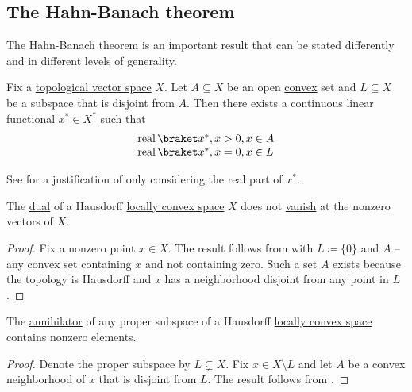 \subsection{The Hahn-Banach theorem}\label{subsec:hahn_banach}

The Hahn-Banach theorem is an important result that can be stated differently and in different levels of generality.

\begin{theorem}\label{thm:geometric_hahn_banach}\mcite\cite[24]{Йоффе1974}
  Fix a \hyperref[def:topological_vector_space]{topological vector space} \( X \). Let \( A \subseteq X \) be an open \hyperref[def:convex_set]{convex} set and \( L \subseteq X \) be a subspace that is disjoint from \( A \). Then there exists a continuous linear functional \( x^* \in X^* \) such that
  \begin{equation*}
    \begin{array}{l}
      \real \inner{x^*} x > 0, x \in A \\
      \real \inner{x^*} x = 0, x \in L
    \end{array}
  \end{equation*}

  See  for a justification of only considering the real part of \( x^* \).
\end{theorem}

\begin{corollary}\label{thm:hahn_banach_implies_functionals_vanish_nowhere}\mcite\cite[24]{Йоффе1974}
  The \hyperref[def:dual_vector_space]{dual} of a Hausdorff \hyperref[def:locally_convex_space]{locally convex space} \( X \) does not \hyperref[def:functions_vanish_nowhere]{vanish} at the nonzero vectors of \( X \).
\end{corollary}
\begin{proof}
  Fix a nonzero point \( x \in X \). The result follows from  with \( L \coloneqq \{ 0 \} \) and \( A \) -- any convex set containing \( x \) and not containing zero. Such a set \( A \) exists because the topology is Hausdorff and \( x \) has a neighborhood disjoint from any point in \( L \).
\end{proof}

\begin{corollary}\label{thm:hahn_banach_implies_annihilator_nontrivial}\mcite\cite[25]{Йоффе1974}
  The \hyperref[def:vector_space_annihilator]{annihilator} of any proper subspace of a Hausdorff \hyperref[def:locally_convex_space]{locally convex space} contains nonzero elements.
\end{corollary}
\begin{proof}
  Denote the proper subspace by \( L \subsetneq X \). Fix \( x \in X \setminus L \) and let \( A \) be a convex neighborhood of \( x \) that is disjoint from \( L \). The result follows from .
\end{proof}

